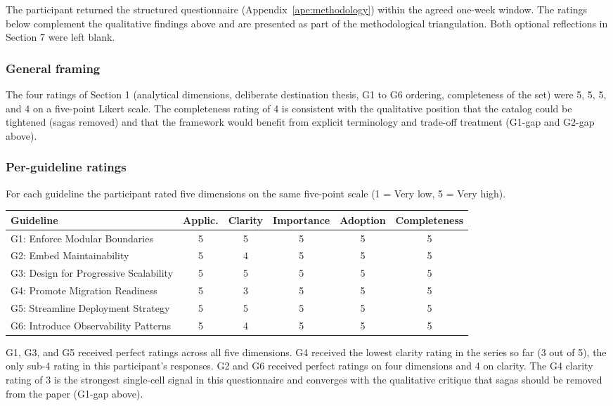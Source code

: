 The participant returned the structured questionnaire (Appendix~\ref{ape:methodology}) within the agreed one-week window. The ratings below complement the qualitative findings above and are presented as part of the methodological triangulation. Both optional reflections in Section 7 were left blank.

\subsubsection*{General framing}

The four ratings of Section 1 (analytical dimensions, deliberate destination thesis, G1 to G6 ordering, completeness of the set) were 5, 5, 5, and 4 on a five-point Likert scale. The completeness rating of 4 is consistent with the qualitative position that the catalog could be tightened (sagas removed) and that the framework would benefit from explicit terminology and trade-off treatment (G1-gap and G2-gap above).

\subsubsection*{Per-guideline ratings}

For each guideline the participant rated five dimensions on the same five-point scale (1 = Very low, 5 = Very high).

\begin{longtable}{p{5cm} c c c c c}
\toprule
\textbf{Guideline} & \textbf{Applic.} & \textbf{Clarity} & \textbf{Importance} & \textbf{Adoption} & \textbf{Completeness} \\
\midrule
\endhead
G1: Enforce Modular Boundaries  & 5 & 5 & 5 & 5 & 5 \\
G2: Embed Maintainability       & 5 & 4 & 5 & 5 & 5 \\
G3: Design for Progressive Scalability & 5 & 5 & 5 & 5 & 5 \\
G4: Promote Migration Readiness & 5 & 3 & 5 & 5 & 5 \\
G5: Streamline Deployment Strategy & 5 & 5 & 5 & 5 & 5 \\
G6: Introduce Observability Patterns & 5 & 4 & 5 & 5 & 5 \\
\bottomrule
\end{longtable}

G1, G3, and G5 received perfect ratings across all five dimensions. G4 received the lowest clarity rating in the series so far (3 out of 5), the only sub-4 rating in this participant's responses. G2 and G6 received perfect ratings on four dimensions and 4 on clarity. The G4 clarity rating of 3 is the strongest single-cell signal in this questionnaire and converges with the qualitative critique that sagas should be removed from the paper (G1-gap above).

